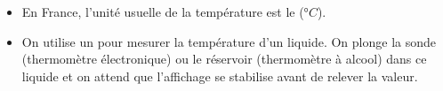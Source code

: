 \begin{mybilan}
	\begin{itemize}
		\item En France, l'unité usuelle de la température est le  (°$C$). 
		\item On utilise un  pour mesurer la température d'un liquide. On plonge la sonde (thermomètre électronique) ou le réservoir (thermomètre à alcool) dans ce liquide et on attend que l'affichage se stabilise avant de relever la valeur.
	\end{itemize}
\end{mybilan}